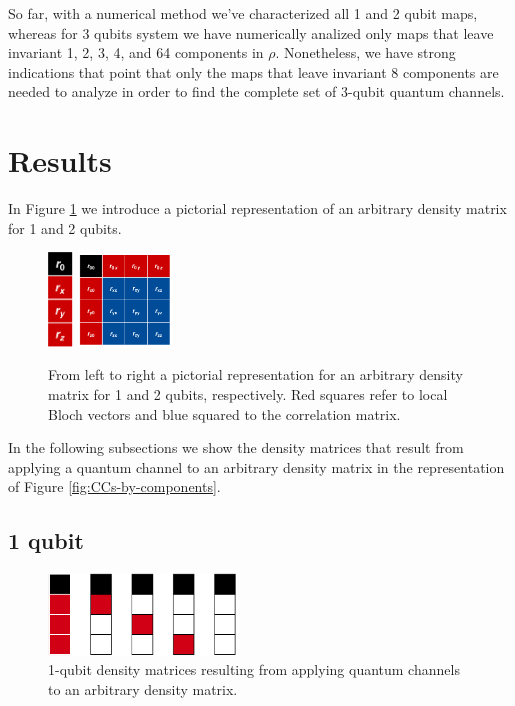\documentclass[11pt,dvipsnames]{article} %
\begin{document}
So far, with a numerical method we've characterized all 1 and 2 qubit maps, 
whereas for 3 qubits system we have numerically analized only maps that leave 
invariant 1, 2, 3, 4, and 64 components in $\rho$. Nonetheless, we have strong
indications that point that only the maps that leave invariant 8 components are 
needed to analyze in order to find the complete set of 3-qubit quantum 
channels.
\section*{Results}
In Figure \ref{fig:pictorial-rep-rho} we introduce a pictorial representation 
of an arbitrary density matrix for 1 and 2 qubits.
\begin{figure}[H]
	\centering
	\hfill \hfill
	\includegraphics[height=2.5cm]
	{img/tablero-1q}
	\hfill
	\includegraphics[width=2.5cm]
	{img/rho2q(2)}
	\hfill \hfill
	\caption{From left to right a pictorial representation for an arbitrary
	density matrix for 1 and 2 qubits, respectively. Red squares refer to local
	Bloch vectors and blue squared to the correlation matrix.}
	\label{fig:pictorial-rep-rho}
\end{figure}
In the following subsections we show the density matrices that result from
applying a quantum channel to an arbitrary density matrix in the representation
of Figure \ref{fig:CCs-by-components}.

\subsection*{1 qubit}
\begin{figure}[H]
	\centering
	\includegraphics[width=5cm]
	{img/1q-CCs.png}
	\caption{1-qubit density matrices resulting from applying quantum channels
	to an arbitrary density matrix.}
\end{figure}
\end{document}
